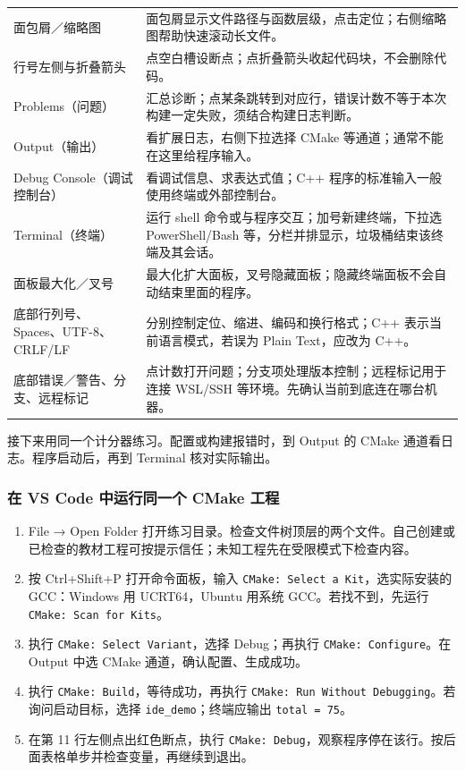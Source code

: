\begin{longtable}{p{}p{}}
面包屑／缩略图 & 面包屑显示文件路径与函数层级，点击定位；右侧缩略图帮助快速滚动长文件。\\
行号左侧与折叠箭头 & 点空白槽设断点；点折叠箭头收起代码块，不会删除代码。\\
Problems（问题） & 汇总诊断；点某条跳转到对应行，错误计数不等于本次构建一定失败，须结合构建日志判断。\\
Output（输出） & 看扩展日志，右侧下拉选择 CMake 等通道；通常不能在这里给程序输入。\\
Debug Console（调试控制台） & 看调试信息、求表达式值；C++ 程序的标准输入一般使用终端或外部控制台。\\
Terminal（终端） & 运行 shell 命令或与程序交互；加号新建终端，下拉选 PowerShell/Bash 等，分栏并排显示，垃圾桶结束该终端及其会话。\\
面板最大化／叉号 & 最大化扩大面板，叉号隐藏面板；隐藏终端面板不会自动结束里面的程序。\\
底部行列号、Spaces、UTF-8、CRLF/LF & 分别控制定位、缩进、编码和换行格式；C++ 表示当前语言模式，若误为 Plain Text，应改为 C++。\\
底部错误／警告、分支、远程标记 & 点计数打开问题；分支项处理版本控制；远程标记用于连接 WSL/SSH 等环境。先确认当前到底连在哪台机器。\\
\bottomrule[1.5pt]
\end{longtable}\endgroup

接下来用同一个计分器练习。配置或构建报错时，到 Output 的 CMake 通道看日志。程序启动后，再到 Terminal 核对实际输出。

\subsubsection{在 VS Code 中运行同一个 CMake 工程}
\begin{example}
\begin{enumerate}
\item File → Open Folder 打开练习目录。检查文件树顶层的两个文件。自己创建或已检查的教材工程可按提示信任；未知工程先在受限模式下检查内容。
\item 按 Ctrl+Shift+P 打开命令面板，输入 \texttt{CMake: Select a Kit}，选实际安装的 GCC：Windows 用 UCRT64，Ubuntu 用系统 GCC。若找不到，先运行 \texttt{CMake: Scan for Kits}。
\item 执行 \texttt{CMake: Select Variant}，选择 Debug；再执行 \texttt{CMake: Configure}。在 Output 中选 CMake 通道，确认配置、生成成功。
\item 执行 \texttt{CMake: Build}，等待成功，再执行 \texttt{CMake: Run Without Debugging}。若询问启动目标，选择 \texttt{ide\_demo}；终端应输出 \texttt{total = 75}。
\item 在第 11 行左侧点出红色断点，执行 \texttt{CMake: Debug}，观察程序停在该行。按后面表格单步并检查变量，再继续到退出。
\end{enumerate}
\end{example}

